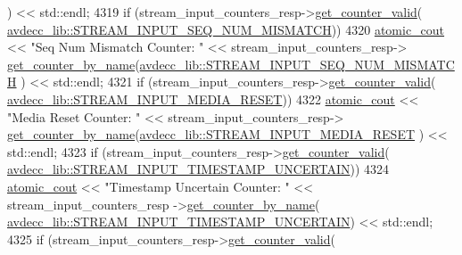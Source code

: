 \begin{DoxyCode}
      ) << std::endl;
4319                 \textcolor{keywordflow}{if} (stream\_input\_counters\_resp->\hyperlink{classavdecc__lib_1_1stream__input__counters__response_a1a714d004a3ca8b521311ba4d3e62e93}{get\_counter\_valid}(
      \hyperlink{namespaceavdecc__lib_a831be56dba8ac423258a9374a1202df4a6b7e8a7f845a2e21eab9197698c206e6}{avdecc\_lib::STREAM\_INPUT\_SEQ\_NUM\_MISMATCH}))
4320                     \hyperlink{cmd__line_8h_a0bc38ccc65c79ba06c6fcd7b4bf554c3}{atomic\_cout} << \textcolor{stringliteral}{"Seq Num Mismatch Counter: "} << stream\_input\_counters\_resp->
      \hyperlink{classavdecc__lib_1_1stream__input__counters__response_aad68050f63fc17c24527b3157d6ca8c7}{get\_counter\_by\_name}(\hyperlink{namespaceavdecc__lib_a831be56dba8ac423258a9374a1202df4a6b7e8a7f845a2e21eab9197698c206e6}{avdecc\_lib::STREAM\_INPUT\_SEQ\_NUM\_MISMATCH}
      ) << std::endl;
4321                 \textcolor{keywordflow}{if} (stream\_input\_counters\_resp->\hyperlink{classavdecc__lib_1_1stream__input__counters__response_a1a714d004a3ca8b521311ba4d3e62e93}{get\_counter\_valid}(
      \hyperlink{namespaceavdecc__lib_a831be56dba8ac423258a9374a1202df4aed282fd78c956105ffa934f89f9a4e84}{avdecc\_lib::STREAM\_INPUT\_MEDIA\_RESET}))
4322                     \hyperlink{cmd__line_8h_a0bc38ccc65c79ba06c6fcd7b4bf554c3}{atomic\_cout} << \textcolor{stringliteral}{"Media Reset Counter: "} << stream\_input\_counters\_resp->
      \hyperlink{classavdecc__lib_1_1stream__input__counters__response_aad68050f63fc17c24527b3157d6ca8c7}{get\_counter\_by\_name}(\hyperlink{namespaceavdecc__lib_a831be56dba8ac423258a9374a1202df4aed282fd78c956105ffa934f89f9a4e84}{avdecc\_lib::STREAM\_INPUT\_MEDIA\_RESET}
      ) << std::endl;
4323                 \textcolor{keywordflow}{if} (stream\_input\_counters\_resp->\hyperlink{classavdecc__lib_1_1stream__input__counters__response_a1a714d004a3ca8b521311ba4d3e62e93}{get\_counter\_valid}(
      \hyperlink{namespaceavdecc__lib_a831be56dba8ac423258a9374a1202df4ab79637804bbe4db282849e6c285bb916}{avdecc\_lib::STREAM\_INPUT\_TIMESTAMP\_UNCERTAIN}))
4324                     \hyperlink{cmd__line_8h_a0bc38ccc65c79ba06c6fcd7b4bf554c3}{atomic\_cout} << \textcolor{stringliteral}{"Timestamp Uncertain Counter: "} << stream\_input\_counters\_resp
      ->\hyperlink{classavdecc__lib_1_1stream__input__counters__response_aad68050f63fc17c24527b3157d6ca8c7}{get\_counter\_by\_name}(
      \hyperlink{namespaceavdecc__lib_a831be56dba8ac423258a9374a1202df4ab79637804bbe4db282849e6c285bb916}{avdecc\_lib::STREAM\_INPUT\_TIMESTAMP\_UNCERTAIN}) << std::endl;
4325                 \textcolor{keywordflow}{if} (stream\_input\_counters\_resp->\hyperlink{classavdecc__lib_1_1stream__input__counters__response_a1a714d004a3ca8b521311ba4d3e62e93}{get\_counter\_valid}(

\end{DoxyCode}
